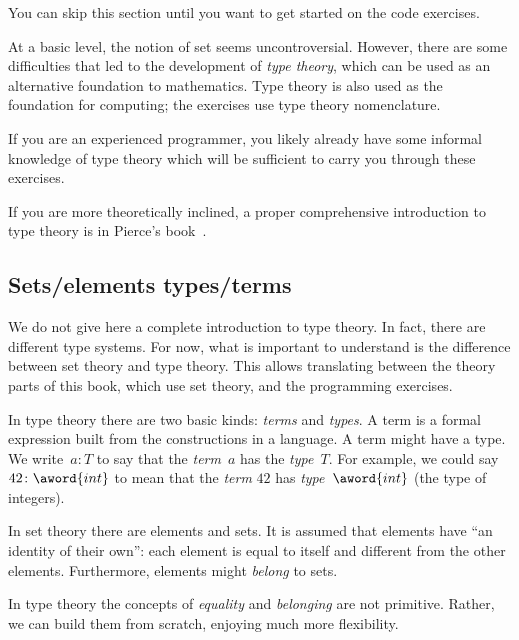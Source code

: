 
\begin{remark}
    You can skip this section until you want to get started on the code exercises.
\end{remark}

At a basic level, the notion of set seems uncontroversial.
However, there are some difficulties that led to the development of \emph{type theory},
which can be used as an alternative foundation to mathematics.
Type theory is also used as the foundation for computing; the exercises use type theory nomenclature.

If you are an experienced programmer, you likely already have some informal knowledge of type theory which will be sufficient to carry you through these exercises.


If you are more theoretically inclined, a proper comprehensive introduction to type theory is in Pierce's book~\cite{pierce02types}.

\subsection{Sets/elements \vs types/terms}

We do not give here a complete introduction to type theory.
In fact, there are different type systems.
For now, what is important to understand is the difference between set theory and type theory.
This allows translating between the theory parts of this book, which use set theory, and the programming exercises.

In type theory there are two basic kinds: \emph{terms} and \emph{types}.
A term is a formal expression built from the constructions in a language.
A term might have a type.
We write~$a \colon T$ to say that the \emph{term}~$a$ has the \emph{type}~$T$.
For example, we could say~$42 \colon \aword{int}$ to mean that the \emph{term} $42$ has \emph{type}~$\aword{int}$ (the type of integers).

In set theory there are elements and sets.
It is assumed that elements have ``an identity of their own'': each element is equal to itself and different from the other elements.
Furthermore, elements might \emph{belong} to sets.

In type theory the concepts of \emph{equality} and \emph{belonging} are not primitive.
Rather, we can build them from scratch, enjoying much more flexibility.


